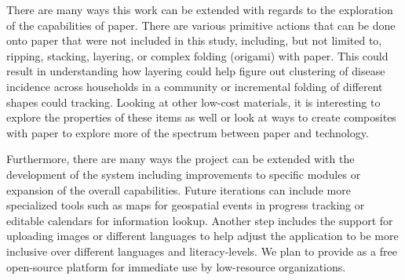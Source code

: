 \documentclass{sig-alternate}
\begin{document}
There are many ways this work can be extended with regards to the exploration of the capabilities of paper. There are various primitive actions that can be done onto paper that were not included in this study, including, but not limited to, ripping, stacking, layering, or complex folding (origami) with paper. This could result in understanding how layering could help figure out clustering of disease incidence across households in a community or incremental folding of different shapes could  tracking. Looking at other low-cost materials, it is interesting to explore the properties of these items as well or look at ways to create composites with paper to explore more of the spectrum between paper and technology.

Furthermore, there are many ways the project can be extended with the development of the \nifty system including improvements to specific modules or expansion of the overall capabilities. Future iterations can include more specialized tools such as maps for geospatial events in progress tracking or editable calendars for information lookup. Another step includes the support for uploading images or different languages to help adjust the application to be more inclusive over different languages and literacy-levels. We plan to provide \nifty as a free open-source platform for immediate use by low-resource organizations.


\end{document}
